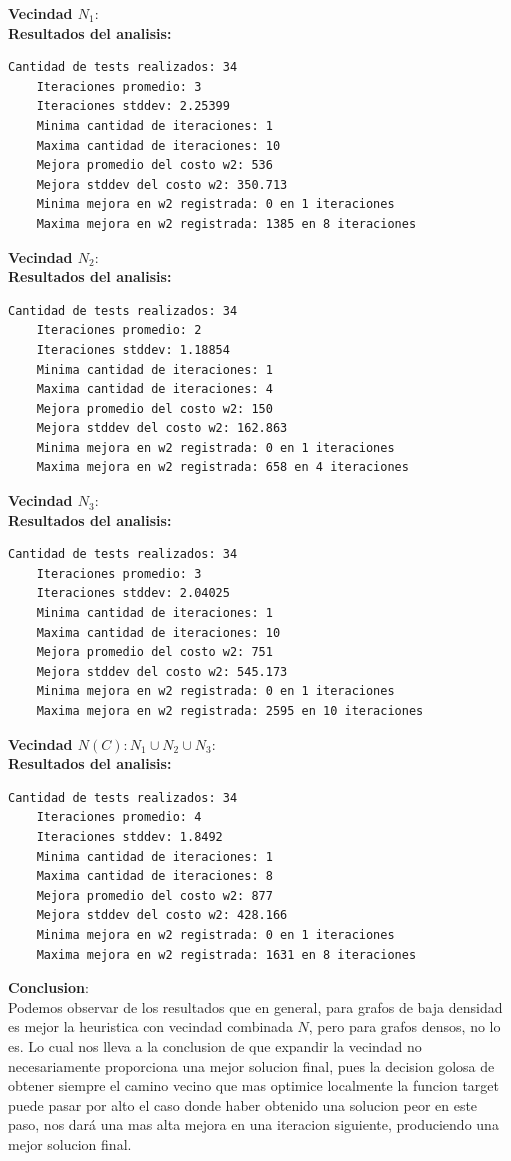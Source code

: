 \textbf{Vecindad $N_1$}:\\%
\textbf{Resultados del analisis:}
\begin{lstlisting}[frame=single]
	Cantidad de tests realizados: 34
	Iteraciones promedio: 3
	Iteraciones stddev: 2.25399
	Minima cantidad de iteraciones: 1
	Maxima cantidad de iteraciones: 10
	Mejora promedio del costo w2: 536
	Mejora stddev del costo w2: 350.713
	Minima mejora en w2 registrada: 0 en 1 iteraciones
	Maxima mejora en w2 registrada: 1385 en 8 iteraciones
\end{lstlisting}

\textbf{Vecindad $N_2$}:\\%
\textbf{Resultados del analisis:}
\begin{lstlisting}[frame=single]
	Cantidad de tests realizados: 34
	Iteraciones promedio: 2
	Iteraciones stddev: 1.18854
	Minima cantidad de iteraciones: 1
	Maxima cantidad de iteraciones: 4
	Mejora promedio del costo w2: 150
	Mejora stddev del costo w2: 162.863
	Minima mejora en w2 registrada: 0 en 1 iteraciones
	Maxima mejora en w2 registrada: 658 en 4 iteraciones
\end{lstlisting}

\textbf{Vecindad $N_3$}:\\%
\textbf{Resultados del analisis:}
\begin{lstlisting}[frame=single]
	Cantidad de tests realizados: 34
	Iteraciones promedio: 3
	Iteraciones stddev: 2.04025
	Minima cantidad de iteraciones: 1
	Maxima cantidad de iteraciones: 10
	Mejora promedio del costo w2: 751
	Mejora stddev del costo w2: 545.173
	Minima mejora en w2 registrada: 0 en 1 iteraciones
	Maxima mejora en w2 registrada: 2595 en 10 iteraciones
\end{lstlisting}

\textbf{Vecindad $N(C): N_1 \cup N_2 \cup N_3$}:\\
\textbf{Resultados del analisis:}
\begin{lstlisting}[frame=single]
	Cantidad de tests realizados: 34
	Iteraciones promedio: 4
	Iteraciones stddev: 1.8492
	Minima cantidad de iteraciones: 1
	Maxima cantidad de iteraciones: 8
	Mejora promedio del costo w2: 877
	Mejora stddev del costo w2: 428.166
	Minima mejora en w2 registrada: 0 en 1 iteraciones
	Maxima mejora en w2 registrada: 1631 en 8 iteraciones
\end{lstlisting}

\vspace{1cm}
\textbf{Conclusion}:\\
Podemos observar de los resultados que en general, para grafos de baja densidad es mejor la heuristica con vecindad combinada $N$, pero para grafos densos, no lo es. Lo cual nos lleva a la conclusion de que expandir la vecindad no necesariamente proporciona una mejor solucion final, pues la decision golosa de obtener siempre el camino vecino que mas optimice localmente la funcion target puede pasar por alto el caso donde haber obtenido una solucion peor en este paso, nos dar\'a una mas alta mejora en una iteracion siguiente, produciendo una mejor solucion final.